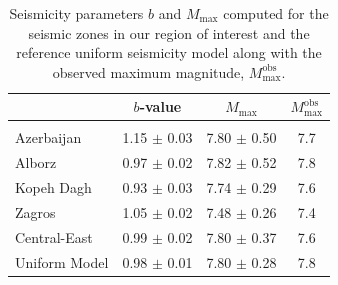 
\begin{table}%
    \centering
    \caption{Seismicity parameters $b$ and $M_{\max}$ computed for the seismic zones in our region of interest and the reference uniform seismicity model along with the observed maximum magnitude, $M_{\max}^{\mathrm{obs}}$.}
    \begin{tabular}{@{\hspace{0.2ex}}lccc@{\hspace{0.2ex}}}
        \cline{2-4}                                                                         \\[-1.6ex]
                        & $b$-value         & $M_{\max}$        & $M_{\max}^{\mathrm{obs}}$ \\[0.6ex]
        \hline                                                                              \\[-1.6ex]
        Azerbaijan      & 1.15 $\pm$ 0.03   & 7.80 $\pm$ 0.50   & 7.7                       \\
        Alborz          & 0.97 $\pm$ 0.02   & 7.82 $\pm$ 0.52   & 7.8                       \\
        Kopeh Dagh      & 0.93 $\pm$ 0.03   & 7.74 $\pm$ 0.29   & 7.6                       \\
        Zagros          & 1.05 $\pm$ 0.02   & 7.48 $\pm$ 0.26   & 7.4                       \\
        Central-East    & 0.99 $\pm$ 0.02   & 7.80 $\pm$ 0.37   & 7.6                       \\
        Uniform Model   & 0.98 $\pm$ 0.01   & 7.80 $\pm$ 0.28   & 7.8                       \\[0.5ex]
        \hline
    \end{tabular}
    \label{tab:params}
\end{table}


